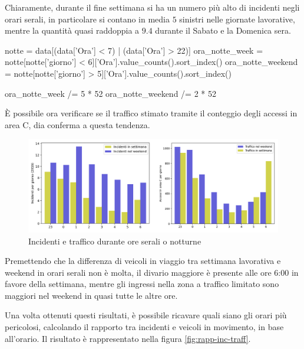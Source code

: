 \documentclass[a4paper,12pt]{report}
\begin{document}
Chiaramente, durante il fine settimana si ha un numero 
più alto di incidenti negli orari serali, 
in particolare si contano in media $5$ sinistri nelle giornate lavorative, 
mentre la quantità quasi raddoppia a $9.4$ durante il Sabato e la Domenica sera. 

\begin{code}
notte = data[(data['Ora'] < 7) | (data['Ora'] > 22)]
ora_notte_week = notte[notte['giorno'] < 6]['Ora'].value_counts().sort_index()
ora_notte_weekend = notte[notte['giorno'] > 5]['Ora'].value_counts().sort_index()

ora_notte_week /= 5 * 52  
ora_notte_weekend /= 2 * 52
\end{code}

\`E possibile ora verificare se il traffico stimato tramite il conteggio degli 
accessi in area C, dia conferma a questa tendenza.

\begin{figure}
    \includegraphics[width=\linewidth]{img_unite/ore_punta.png}
    \caption{Incidenti e traffico durante ore serali o notturne}
    \label{fig:ore-notte}
\end{figure}

Premettendo che la differenza di veicoli in viaggio tra settimana lavorativa e 
weekend in orari serali non è molta, il divario maggiore è presente alle ore 6:00 
in favore della settimana, mentre gli ingressi nella zona a traffico limitato 
sono maggiori nel weekend in quasi tutte le altre ore. 

Una volta ottenuti questi risultati, è possibile ricavare quali siano gli orari
più pericolosi, calcolando il rapporto tra incidenti e veicoli in movimento, 
in base all'orario. 
Il risultato è rappresentato nella figura \ref{fig:rapp-inc-traff}. 
\end{document}
